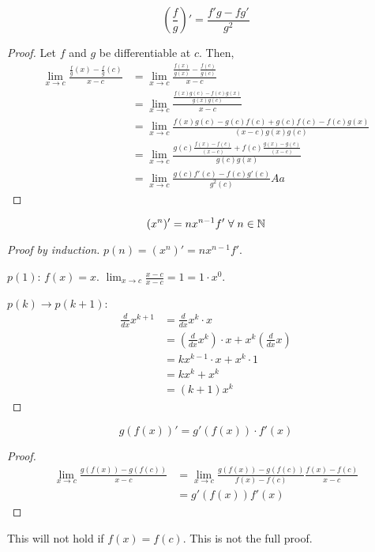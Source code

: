 \begin{theorem}
    $$\left(\frac{f}{g}\right)' = \frac{f'g - fg'}{g^2}$$
\end{theorem}
\begin{proof}
    Let $f$ and $g$ be differentiable at $c$. Then,
    \begin{align*}
        \lim_{x \to c} \frac{\frac{f}{g}(x) - \frac{f}{g}(c)}{x - c} &= \lim_{x \to c} \frac{\frac{f(x)}{g(x)} - \frac{f(c)}{g(c)}}{x - c} \\
        &= \lim_{x \to c} \frac{\frac{f(x)g(c) - f(c)g(x)}{g(x)g(c)}}{x - c} \\
        &= \lim_{x \to c} \frac{f(x)g(c) - g(c)f(c) + g(c)f(c) - f(c)g(x)}{(x - c) g(x)g(c)} \\
        &= \lim_{x \to c} \frac{g(c) \frac{f(x) - f(c)}{(x - c)} + f(c) \frac{g(x) - g(c)}{(x - c)}}{g(c)g(x)} \\
        &= \lim_{x \to c} \frac{g(c)f'(c) - f(c)g'(c)}{g^2(c)}Aa
    \end{align*}
\end{proof}

\begin{theorem}
    $$(x^n)' = nx^{n - 1}f' \;\forall\; n \in \mathbb{N}$$
\end{theorem}
\begin{proof}[Proof by induction]
    $p(n) = (x^n)' = nx^{n - 1}f'$.

    $p(1)$: $f(x) = x$. $\lim_{x \to c} \frac{x - c}{x - c} = 1 = 1 \cdot x^0$.

    $p(k) \rightarrow p(k + 1)$:
    \begin{align*}
        \frac{d}{dx} x^{k + 1} &= \frac{d}{dx} x^k \cdot x \\
        &= (\frac{d}{dx} x^k) \cdot x + x^k (\frac{d}{dx} x) \\
        &= kx^{k - 1} \cdot x + x^k \cdot 1 \\
        &= kx^k + x^k \\
        &= (k + 1)x^k
    \end{align*}
\end{proof}

\begin{theorem}
    $$g(f(x))' = g'(f(x)) \cdot f'(x)$$
\end{theorem}
\begin{proof}
    \begin{align*}
        \lim_{x \to c} \frac{g(f(x)) - g(f(c))}{x - c} &= \lim_{x \to c} \frac{g(f(x)) - g(f(c))}{f(x) - f(c)} \frac{f(x) - f(c)}{x - c} \\
        &= g'(f(x)) f'(x)
    \end{align*}
\end{proof}
\begin{remark}
    This will not hold if $f(x) = f(c)$. This is not the full proof.
\end{remark}
